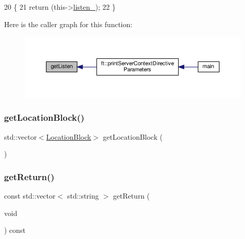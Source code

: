 \begin{DoxyCode}
20     \{
21         \textcolor{keywordflow}{return} (this->\hyperlink{classft_1_1_server_block_a5105357e893dd34d8e22d48def2fbafa}{listen\_});
22     \}
\end{DoxyCode}
Here is the caller graph for this function\+:
\nopagebreak
\begin{figure}[H]
\begin{center}
\leavevmode
\includegraphics[width=350pt]{classft_1_1_server_block_afc115b2997340935536bf8135e02b68c_icgraph}
\end{center}
\end{figure}
\mbox{\label{classft_1_1_server_block_abad572e5e2d99f3c9d53005ad8c2bcf9}} 
\subsubsection{\texorpdfstring{get\+Location\+Block()}{getLocationBlock()}}
{\footnotesize\ttfamily std\+::vector$<$\hyperlink{classft_1_1_location_block}{Location\+Block}$>$ get\+Location\+Block (\begin{DoxyParamCaption}{ }\end{DoxyParamCaption})}

\mbox{\label{classft_1_1_server_block_aeef5e4710c02406c46e54d4aa0c8f57c}} 
\subsubsection{\texorpdfstring{get\+Return()}{getReturn()}}
{\footnotesize\ttfamily const std\+::vector$<$ std\+::string $>$ get\+Return (\begin{DoxyParamCaption}\item[{void}]{ }\end{DoxyParamCaption}) const}



